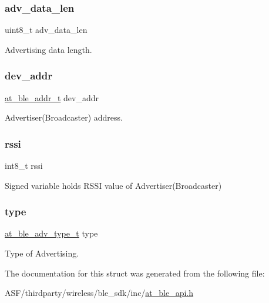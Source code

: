 \subsubsection{\texorpdfstring{adv\_data\_len}{adv\_data\_len}}
{\footnotesize\ttfamily uint8\+\_\+t adv\+\_\+data\+\_\+len}



Advertising data length. 

\mbox{\label{structat__ble__scan__info__t_a2ba08a1eda716380203dae4e72fda99e}} 
\subsubsection{\texorpdfstring{dev\_addr}{dev\_addr}}
{\footnotesize\ttfamily \mbox{\hyperlink{structat__ble__addr__t}{at\+\_\+ble\+\_\+addr\+\_\+t}} dev\+\_\+addr}



Advertiser(\+Broadcaster) address. 

\mbox{\label{structat__ble__scan__info__t_a3b962e67ba74725bd60ca3c29f785abe}} 
\subsubsection{\texorpdfstring{rssi}{rssi}}
{\footnotesize\ttfamily int8\+\_\+t rssi}



Signed variable holds R\+S\+SI value of Advertiser(\+Broadcaster) 

\mbox{\label{structat__ble__scan__info__t_aad7b738a689480d37a637145af51978d}} 
\subsubsection{\texorpdfstring{type}{type}}
{\footnotesize\ttfamily \mbox{\hyperlink{at__ble__api_8h_a6c5e17c16e2d49e866f2f1effd646741}{at\+\_\+ble\+\_\+adv\+\_\+type\+\_\+t}} type}



Type of Advertising. 



The documentation for this struct was generated from the following file\+:\begin{DoxyCompactItemize}
\item 
A\+S\+F/thirdparty/wireless/ble\+\_\+sdk/inc/\mbox{\hyperlink{at__ble__api_8h}{at\+\_\+ble\+\_\+api.\+h}}\end{DoxyCompactItemize}
